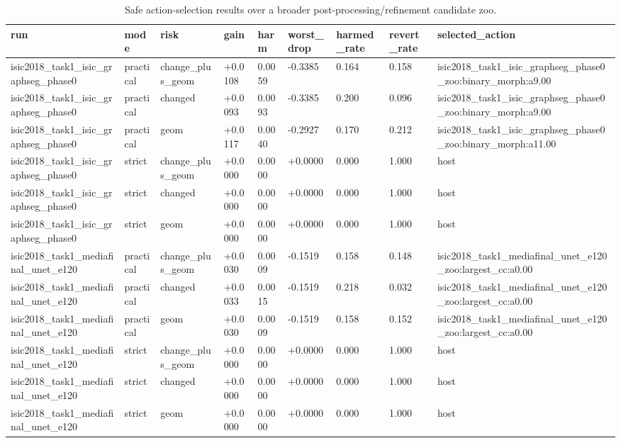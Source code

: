 \begin{table}[t]
\centering
\small
\caption{Safe action-selection results over a broader post-processing/refinement candidate zoo.}
\label{tab:refiner_zoo_crc}
\begin{tabular}{lllllllll}
\toprule
run & mode & risk & gain & harm & worst\_drop & harmed\_rate & revert\_rate & selected\_action \\
\midrule
isic2018\_task1\_isic\_graphseg\_phase0 & practical & change\_plus\_geom & +0.0108 & 0.0059 & -0.3385 & 0.164 & 0.158 & isic2018\_task1\_isic\_graphseg\_phase0\_zoo:binary\_morph:a9.00 \\
isic2018\_task1\_isic\_graphseg\_phase0 & practical & changed & +0.0093 & 0.0093 & -0.3385 & 0.200 & 0.096 & isic2018\_task1\_isic\_graphseg\_phase0\_zoo:binary\_morph:a9.00 \\
isic2018\_task1\_isic\_graphseg\_phase0 & practical & geom & +0.0117 & 0.0040 & -0.2927 & 0.170 & 0.212 & isic2018\_task1\_isic\_graphseg\_phase0\_zoo:binary\_morph:a11.00 \\
isic2018\_task1\_isic\_graphseg\_phase0 & strict & change\_plus\_geom & +0.0000 & 0.0000 & +0.0000 & 0.000 & 1.000 & host \\
isic2018\_task1\_isic\_graphseg\_phase0 & strict & changed & +0.0000 & 0.0000 & +0.0000 & 0.000 & 1.000 & host \\
isic2018\_task1\_isic\_graphseg\_phase0 & strict & geom & +0.0000 & 0.0000 & +0.0000 & 0.000 & 1.000 & host \\
isic2018\_task1\_mediafinal\_unet\_e120 & practical & change\_plus\_geom & +0.0030 & 0.0009 & -0.1519 & 0.158 & 0.148 & isic2018\_task1\_mediafinal\_unet\_e120\_zoo:largest\_cc:a0.00 \\
isic2018\_task1\_mediafinal\_unet\_e120 & practical & changed & +0.0033 & 0.0015 & -0.1519 & 0.218 & 0.032 & isic2018\_task1\_mediafinal\_unet\_e120\_zoo:largest\_cc:a0.00 \\
isic2018\_task1\_mediafinal\_unet\_e120 & practical & geom & +0.0030 & 0.0009 & -0.1519 & 0.158 & 0.152 & isic2018\_task1\_mediafinal\_unet\_e120\_zoo:largest\_cc:a0.00 \\
isic2018\_task1\_mediafinal\_unet\_e120 & strict & change\_plus\_geom & +0.0000 & 0.0000 & +0.0000 & 0.000 & 1.000 & host \\
isic2018\_task1\_mediafinal\_unet\_e120 & strict & changed & +0.0000 & 0.0000 & +0.0000 & 0.000 & 1.000 & host \\
isic2018\_task1\_mediafinal\_unet\_e120 & strict & geom & +0.0000 & 0.0000 & +0.0000 & 0.000 & 1.000 & host \\

\end{tabular}
\end{table}
